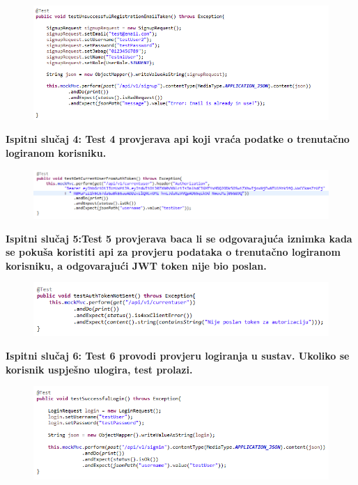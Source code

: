 			\begin{figure}[H]
				\includegraphics[scale=0.9]{slike/test3.PNG} %
				\centering
				\label{fig:test3}
			\end{figure}
			
			\textbf{Ispitni slučaj 4: Test 4 provjerava api koji vraća podatke o trenutačno logiranom korisniku.  }	
			
			\begin{figure}[H]
				\includegraphics[scale=0.9]{slike/test4.PNG} %
				\centering
				\label{fig:test4}
			\end{figure}
			
			\textbf{Ispitni slučaj 5:Test 5 provjerava baca li se odgovarajuća iznimka kada se pokuša koristiti api za 
provjeru podataka o trenutačno logiranom korisniku, a odgovarajući JWT token nije bio poslan.}	
			
			\begin{figure}[H]
				\includegraphics[scale=0.9]{slike/test5.PNG} %
				\centering
				\label{fig:test5}
			\end{figure}
			
			\textbf{Ispitni slučaj 6: Test 6 provodi provjeru logiranja u sustav. Ukoliko se korisnik uspješno ulogira, test prolazi.
}	
			
			\begin{figure}[H]
				\includegraphics[scale=0.9]{slike/test6.PNG} %
				\centering
				\label{fig:test6}
			\end{figure}
			
